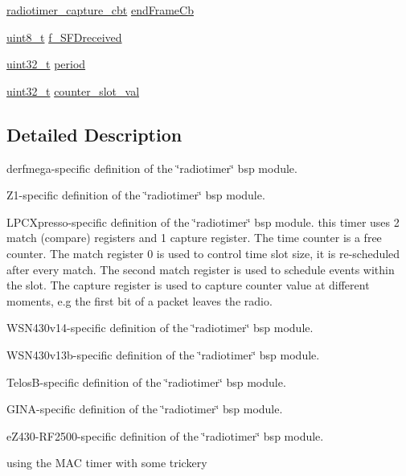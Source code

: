 \begin{DoxyCompactItemize}
\item 
\hyperlink{group__radiotimer_gac7da641d0774aa21bfabefd560e42acf}{radiotimer\+\_\+capture\+\_\+cbt} \hyperlink{structradiotimer__vars__t_a20d98cd6adb6fb5b5e3aedeb01285c64}{end\+Frame\+Cb}
\item 
\hyperlink{_p_e___types_8h_aba7bc1797add20fe3efdf37ced1182c5}{uint8\+\_\+t} \hyperlink{structradiotimer__vars__t_a8d1ed5d74c82ecbae008e5488aa3cdf7}{f\+\_\+\+S\+F\+Dreceived}
\item 
\hyperlink{_p_e___types_8h_a33594304e786b158f3fb30289278f5af}{uint32\+\_\+t} \hyperlink{structradiotimer__vars__t_a2dbe4b80aec79063b57f370128a75ece}{period}
\item 
\hyperlink{_p_e___types_8h_a33594304e786b158f3fb30289278f5af}{uint32\+\_\+t} \hyperlink{structradiotimer__vars__t_ac55ab32ed08087acbb5935eceb6fe03d}{counter\+\_\+slot\+\_\+val}
\end{DoxyCompactItemize}


\subsection{Detailed Description}
derfmega-\/specific definition of the \char`\"{}radiotimer\char`\"{} bsp module. 

Z1-\/specific definition of the \char`\"{}radiotimer\char`\"{} bsp module.

L\+P\+C\+Xpresso-\/specific definition of the \char`\"{}radiotimer\char`\"{} bsp module. this timer uses 2 match (compare) registers and 1 capture register. The time counter is a free counter. The match register 0 is used to control time slot size, it is re-\/scheduled after every match. The second match register is used to schedule events within the slot. The capture register is used to capture counter value at different moments, e.\+g the first bit of a packet leaves the radio.

W\+S\+N430v14-\/specific definition of the \char`\"{}radiotimer\char`\"{} bsp module.

W\+S\+N430v13b-\/specific definition of the \char`\"{}radiotimer\char`\"{} bsp module.

Telos\+B-\/specific definition of the \char`\"{}radiotimer\char`\"{} bsp module.

G\+I\+N\+A-\/specific definition of the \char`\"{}radiotimer\char`\"{} bsp module.

e\+Z430-\/\+R\+F2500-\/specific definition of the \char`\"{}radiotimer\char`\"{} bsp module.

using the M\+AC timer with some trickery

